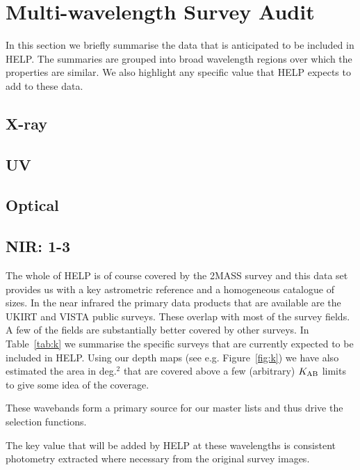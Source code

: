 \documentclass[usenatbib]{mnras}
\begin{document}
\section[Multi-wavelength Survey Audit\\{\color{red}Obsolete?}]{Multi-wavelength Survey Audit}

In this section we briefly summarise the data that is anticipated to be included
in HELP.   The summaries are grouped into broad wavelength regions over which
the properties are similar. We also highlight any specific value that HELP
expects to add to these data.

\subsection{X-ray}

\subsection{UV}

\subsection{Optical}

\subsection{NIR: 1-3\micron}

The whole of HELP is of course covered by the 2MASS survey and this data set
provides us with a key astrometric reference and a homogeneous catalogue of
sizes.  In the  near infrared the primary data products that are available are
the UKIRT and VISTA public surveys.  These overlap with most of the survey
fields. A few of the fields are substantially better covered by other surveys.
In Table~\ref{tab:k} we summarise the specific surveys that are currently
expected to be included in HELP.  Using our depth maps (see e.g.
Figure~\ref{fig:k}) we have also estimated the area in deg.$^2$ that are covered
above a few (arbitrary) $K_{\rm AB}$ limits to give some idea of the coverage.

These wavebands form a primary source for our master lists and thus drive the
selection functions.

The key value that will be added by HELP at these wavelengths is consistent
photometry extracted where necessary from the original survey images.

%   
\end{document}
